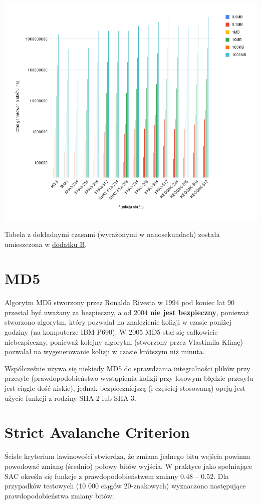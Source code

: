 \documentclass[10pt,a4paper]{article}
\begin{document}
\includegraphics[width=\textwidth]{img/2.png}

Tabela z dokładnymi czasami (wyrażonymi w nanosekundach) została umieszczona w \hyperlink{app:b}{dodatku B}.

\section*{MD5}

Algorytm MD5 stworzony przez Ronalda Rivesta w 1994 pod koniec lat 90 przestał być uważany za bezpieczny,
a od 2004 \textbf{nie jest bezpieczny}, ponieważ stworzono algorytm, który pozwalał na znalezienie kolizji
w czasie poniżej godziny (na komputerze IBM P690). W 2005 MD5 stał się całkowicie niebezpieczny, ponieważ kolejny
algorytm (stworzony przez Vlastimila Klimę) pozwalał na wygenerowanie kolizji w czasie krótszym niż minuta.

Współcześnie używa się niekiedy MD5 do sprawdzania integralności plików przy przesyle (prawdopodobieństwo wystąpienia kolizji
przy losowym błędzie przesyłu jest ciągle dość niskie), jednak bezpieczniejszą (i częściej stosowaną) opcją jest użycie funkcji
z rodziny SHA-2 lub SHA-3.

\section*{Strict Avalanche Criterion}

Ścisłe kryterium lawinowości stwierdza, że zmiana jednego bitu wejścia powinna powodować zmianę (średnio) połowy bitów wyjścia.
W praktyce jako spełniające SAC określa się funkcje z prawdopodobieństwem zmiany 0.48 -- 0.52.
Dla przypadków testowych (10 000 ciągów 20-znakowych) wyznaczono następujące prawdopodobieństwa zmiany bitów:
\vspace*{1em}
\end{document}
